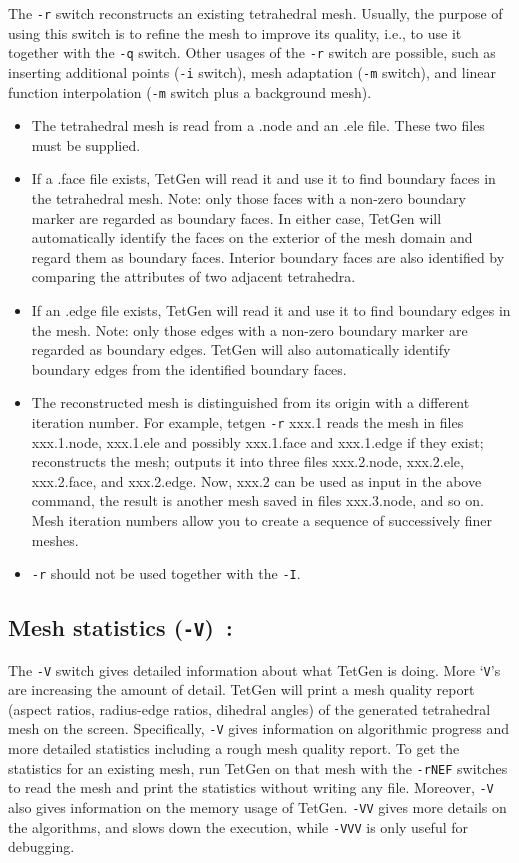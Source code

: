 \documentclass[12pt,twoside,a4paper]{article}
\numberwithin{equation}{section}
\newcommand{\tetq}{\texttt{-q}}
\newcommand{\tetr}{\texttt{-r}}
\newcommand{\tetm}{\texttt{-m}}
\newcommand{\teti}{\texttt{-i}}
\newcommand{\tetV}{\texttt{-V}}
\newcommand{\tetI}{\texttt{-I}}
\begin{document}
The \tetr{} switch reconstructs an existing tetrahedral mesh. Usually, the
purpose of using this switch is to refine the mesh to improve its quality,
i.e., to use it together with the \tetq{} switch. Other usages of the
\tetr{} switch are possible, such as inserting additional points (\teti{}
switch), mesh adaptation (\tetm{} switch), and linear function interpolation
(\tetm{} switch plus a background mesh).
\begin{itemize}
  \item The tetrahedral mesh is read from a .node and an .ele file. These
    two files must be supplied.
  \item If a .face file exists, TetGen will read it and use it to find
    boundary faces in the tetrahedral mesh. Note: only those faces with a
    non-zero boundary marker are regarded as boundary faces. In either case,
    TetGen will automatically identify the faces on the exterior of the mesh
    domain and regard them as boundary faces. Interior boundary faces are
    also identified by comparing the attributes of two adjacent tetrahedra.
\item If an .edge file exists, TetGen will read it and use it to find
  boundary edges in the mesh. Note: only those edges with a non-zero
  boundary marker are regarded as boundary edges. TetGen will also
  automatically identify boundary edges from the identified boundary faces.
\item The reconstructed mesh is distinguished from its origin with a
  different iteration number. For example, tetgen \tetr{} xxx.1 reads the
  mesh in files xxx.1.node, xxx.1.ele and possibly xxx.1.face and xxx.1.edge
  if they exist; reconstructs the mesh; outputs it into three files
  xxx.2.node, xxx.2.ele, xxx.2.face, and xxx.2.edge. Now, xxx.2 can be used
  as input in the above command, the result is another mesh saved in files
  xxx.3.node, and so on. Mesh iteration numbers allow you to create a
  sequence of successively finer meshes.
\item \tetr{} should not be used together with the \tetI{}.
\end{itemize}

\subsection[Mesh statistics]
{Mesh statistics (\tetV{})~\cite[pp. 47--48]{Si2013}:}

The \tetV{} switch gives detailed information about what TetGen is doing.
More ‘\texttt{V}’s are increasing the amount of detail. TetGen will print a
mesh quality report (aspect ratios, radius-edge ratios, dihedral angles) of
the generated tetrahedral mesh on the screen. Specifically, \tetV{} gives
information on algorithmic progress and more detailed statistics including a
rough mesh quality report. To get the statistics for an existing mesh, run
TetGen on that mesh with the \texttt{-rNEF} switches to read the mesh and
print the statistics without writing any file.  Moreover, \texttt{-V} also
gives information on the memory usage of TetGen. \texttt{-VV} gives more
details on the algorithms, and slows down the execution, while \texttt{-VVV}
is only useful for debugging.
\end{document}
